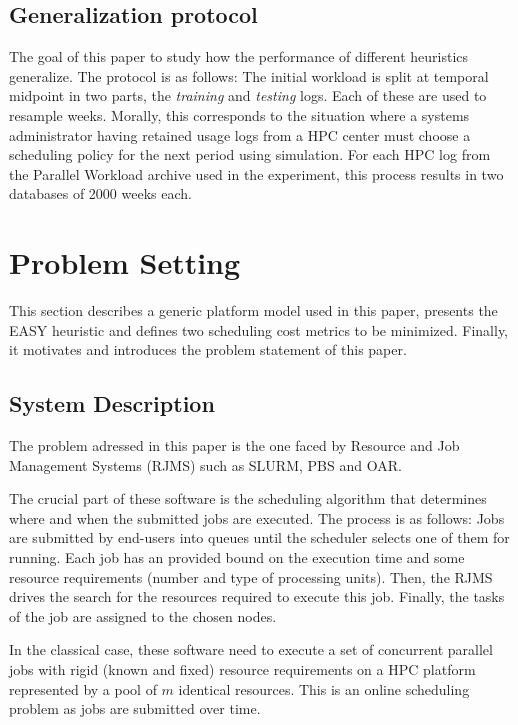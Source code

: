 \subsection{Generalization protocol}
\label{sub:gp}

The goal of this paper to study how the performance of different heuristics
generalize. The protocol is as follows: The initial workload is split
at temporal midpoint in two parts, the \textit{training} and \textit{testing}
logs. Each of these are used to resample weeks. Morally, this corresponds to
the situation where a systems administrator having retained usage logs from a
HPC center must choose a scheduling policy for the next period using
simulation. For each HPC log from the Parallel Workload archive used in the
experiment, this process results in two databases of 2000 weeks each.

\section{Problem Setting}
\label{sec:pbset}

This section describes a generic platform model used in this paper, presents the EASY
heuristic and defines two scheduling cost metrics to be minimized. Finally, it
motivates and introduces the problem statement of this paper.

\subsection{System Description}
\label{sub:sysdesc}

The problem adressed in this paper is the one faced by Resource and Job
Management Systems (RJMS) such as SLURM\cite{SLURMdocSCHED}, PBS\cite{PBSdoc}
and OAR\cite{capit2005batch}.

The crucial part of these software is the scheduling algorithm that determines
where and when the submitted jobs are executed. The process is as follows: Jobs
are submitted by end-users into queues until the scheduler selects one of them
for running. Each job has an provided bound on the execution time and some
resource requirements (number and type of processing units). Then, the RJMS
drives the search for the resources required to execute this job.  Finally, the
tasks of the job are assigned to the chosen nodes.

In the classical case, these software need to execute a set of concurrent
parallel jobs with rigid (known and fixed) resource requirements on a HPC
platform represented by a pool of $m$ identical resources. This is an online
scheduling problem as jobs are submitted over time.

